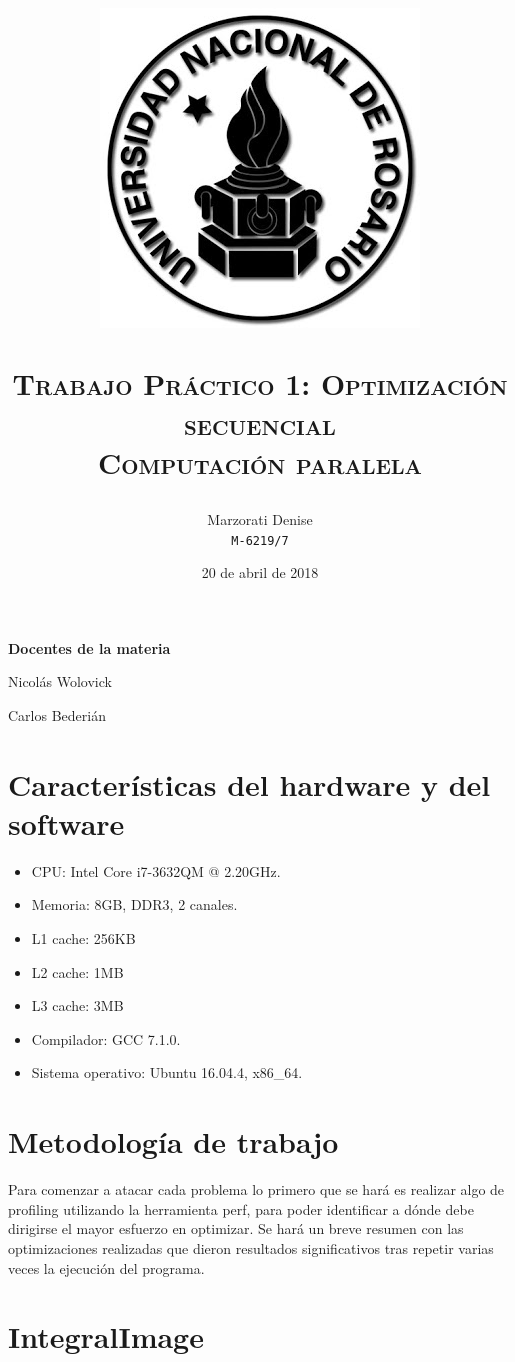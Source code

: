 \documentclass[a4paper,10pt]{article}
\author{
    Marzorati Denise \\
    \texttt{M-6219/7}
}
\date{
    20 de abril de 2018
}
\title{
    \begin{center}
\includegraphics[scale=1]{logo-unr.png}
\end{center}
\Huge \textsc{{\bfseries T}rabajo {\bfseries P}ráctico 1: Optimización secuencial} \\
    \large \textsc{Computación paralela} \\
}
\begin{document}
\bigskip
\bigskip
\bigskip

\maketitle

\thispagestyle{empty}

\begin{center}
\large \bf Docentes de la materia
\end{center}

\begin{center}
Nicolás Wolovick

Carlos Bederián
\end{center}

\newpage{}
\normalsize

\section*{Características del hardware y del software}

\begin{itemize}
  \item CPU: Intel Core i7-3632QM @ 2.20GHz.
  \item Memoria: 8GB, DDR3, 2 canales. 
  \item L1 cache: 256KB
  \item L2 cache: 1MB
  \item L3 cache: 3MB
  \item Compilador: GCC 7.1.0.
  \item Sistema operativo: Ubuntu 16.04.4, x86\_64.
\end{itemize}

\section*{Metodología de trabajo}

Para comenzar a atacar cada problema lo primero que se hará es realizar algo de profiling utilizando la
herramienta perf, para poder identificar a dónde debe dirigirse el mayor esfuerzo en optimizar. 
Se hará un breve resumen con las optimizaciones realizadas que dieron resultados significativos tras
repetir varias veces la ejecución del programa.

\newpage{}
\section*{IntegralImage}
\end{document}
